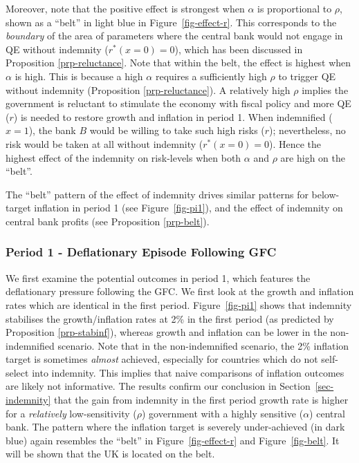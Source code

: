 \documentclass[
  a4paper,
  abstract=true]{scrartcl}
\theoremstyle{definition}
\begin{document}
Moreover, note that the positive effect is strongest when \(\alpha\) is
proportional to \(\rho\), shown as a ``belt'' in light blue in
Figure~\ref{fig-effect-r}. This corresponds to the \emph{boundary} of
the area of parameters where the central bank would not engage in QE
without indemnity (\(r^*(x=0)=0\)), which has been discussed in
Proposition \ref{prp-reluctance}. Note that within the belt, the effect
is highest when \(\alpha\) is high. This is because a high \(\alpha\)
requires a sufficiently high \(\rho\) to trigger QE without indemnity
(Proposition \ref{prp-reluctance}). A relatively high \(\rho\) implies
the government is reluctant to stimulate the economy with fiscal policy
and more QE (\(r\)) is needed to restore growth and inflation in period
1. When indemnified (\(x=1\)), the bank \(B\) would be willing to take
such high risks (\(r\)); nevertheless, no risk would be taken at all
without indemnity (\(r^*(x=0)=0\)). Hence the highest effect of the
indemnity on risk-levels when both \(\alpha\) and \(\rho\) are high on
the ``belt''.

The ``belt'' pattern of the effect of indemnity drives similar patterns
for below-target inflation in period 1 (see Figure~\ref{fig-pi1}), and
the effect of indemnity on central bank profits (see Proposition
\ref{prp-belt}).

\subsubsection{Period 1 - Deflationary Episode Following
GFC}\label{sec-sim-def}

We first examine the potential outcomes in period 1, which features the
deflationary pressure following the GFC. We first look at the growth and
inflation rates which are identical in the first period.
Figure~\ref{fig-pi1} shows that indemnity stabilises the
growth/inflation rates at 2\% in the first period (as predicted by
Proposition \ref{prp-stabinf}), whereas growth and inflation can be
lower in the non-indemnified scenario. Note that in the non-indemnified
scenario, the 2\% inflation target is sometimes \emph{almost} achieved,
especially for countries which do not self-select into indemnity. This
implies that naive comparisons of inflation outcomes are likely not
informative. The results confirm our conclusion in
Section~\ref{sec-indemnity} that the gain from indemnity in the first
period growth rate is higher for a \emph{relatively} low-sensitivity
(\(\rho\)) government with a highly sensitive (\(\alpha\)) central bank.
The pattern where the inflation target is severely under-achieved (in
dark blue) again resembles the ``belt'' in Figure~\ref{fig-effect-r} and
Figure~\ref{fig-belt}. It will be shown that the UK is located on the
belt.
\end{document}
